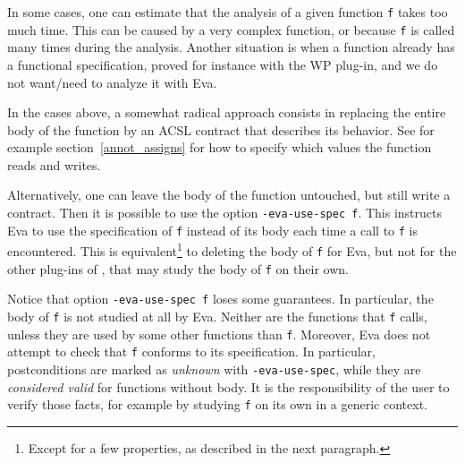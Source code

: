 \documentclass[web]{frama-c-book}
\newcommand{\Eva}{\textsf{Eva}}
\begin{document}
In some cases, one can estimate that the analysis of a given function \verb+f+
takes too much time. This can be caused by a very complex
function, or because \verb+f+ is called many times during the analysis.
Another situation is when a function already has a functional specification,
proved for instance with the \textsf{WP} plug-in, and we do not want/need
to analyze it with \Eva{}.

In the cases above, a somewhat radical
approach consists in replacing the entire body of the function
by an ACSL contract that describes its behavior. See for example
section~\ref{annot_assigns} for how to specify which values the function
reads and writes.

Alternatively, one can leave the body of the function untouched, but
still write a contract. Then it is possible to use the option
\verb+-eva-use-spec f+. This instructs \Eva{} to use the
specification of \verb+f+ instead of its body each time a call to
\verb+f+ is encountered. This is equivalent\footnote{Except for a few
  properties, as described in the next paragraph.} to deleting the body
of \verb+f+ for \Eva{}, but not for the other plug-ins of \FramaC,
that may study the body of \verb+f+ on their own.

Notice that option \verb+-eva-use-spec f+ loses some guarantees. In particular,
the body of \verb+f+ is not studied at all by \Eva{}. Neither
are the functions that \verb+f+ calls, unless they are used by some other
functions than \verb+f+. Moreover, \Eva{} does not attempt
to check that \verb+f+ conforms to its specification. In particular,
postconditions are marked as {\em unknown} with \verb+-eva-use-spec+,
while they are {\em considered valid} for functions without body.
It is the responsibility
of the user to verify those facts, for example by studying \verb+f+
on its own in a generic context.



%
\end{document}
